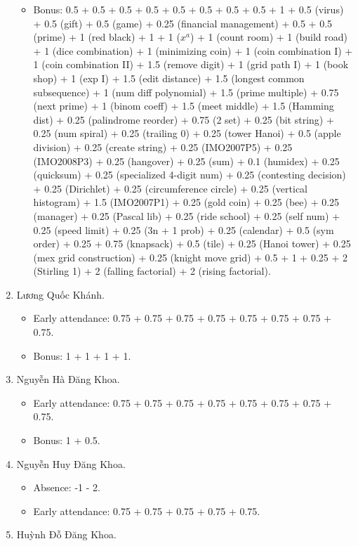 \documentclass{article}
\begin{document}
\begin{enumerate}
\begin{itemize}
		\item Bonus: 0.5 + 0.5 + 0.5 + 0.5 + 0.5 + 0.5 + 0.5 + 0.5 + 1 + 0.5 (virus) + 0.5 (gift) + 0.5 (game) + 0.25 (financial management) + 0.5 + 0.5 (prime) + 1 (red black) + 1 + 1 ($x^a$) + 1 (count room) + 1 (build road) + 1 (dice combination) + 1 (minimizing coin) + 1 (coin combination I) + 1 (coin combination II) + 1.5 (remove digit) + 1 (grid path I) + 1 (book shop) + 1 (exp I) + 1.5 (edit distance) + 1.5 (longest common subsequence) + 1 (num diff polynomial) + 1.5 (prime multiple) + 0.75 (next prime) + 1 (binom coeff) + 1.5 (meet middle) + 1.5 (Hamming dist) + 0.25 (palindrome reorder) + 0.75 (2 set) + 0.25 (bit string) + 0.25 (num spiral) + 0.25 (trailing 0) + 0.25 (tower Hanoi) + 0.5 (apple division) + 0.25 (create string) + 0.25 (IMO2007P5) + 0.25 (IMO2008P3) + 0.25 (hangover) + 0.25 (sum) + 0.1 (humidex) + 0.25 (quicksum) + 0.25 (specialized 4-digit num) + 0.25 (contesting decision) + 0.25 (Dirichlet) + 0.25 (circumference circle) + 0.25 (vertical histogram) + 1.5 (IMO2007P1) + 0.25 (gold coin) + 0.25 (bee) + 0.25 (manager) + 0.25 (Pascal lib) + 0.25 (ride school) + 0.25 (self num) + 0.25 (speed limit) + 0.25 (3n + 1 prob) + 0.25 (calendar) + 0.5 (sym order) + 0.25 + 0.75 (knapsack) + 0.5 (tile) + 0.25 (Hanoi tower) + 0.25 (mex grid construction) + 0.25 (knight move grid) + 0.5 + 1 + 0.25 + 2 (Stirling 1) + 2 (falling factorial) + 2 (rising factorial).
	\end{itemize}
	\item {\sc Lương Quốc Khánh.}
	\begin{itemize}
		\item Early attendance: 0.75 + 0.75 + 0.75 + 0.75 + 0.75 + 0.75 + 0.75 + 0.75.
		\item Bonus: 1 + 1 + 1 + 1.
	\end{itemize}
	\item {\sc Nguyễn Hà Đăng Khoa}.
	\begin{itemize}
		\item Early attendance: 0.75 + 0.75 + 0.75 + 0.75 + 0.75 + 0.75 + 0.75 + 0.75.
		\item Bonus: 1 + 0.5.
	\end{itemize}
	\item {\sc Nguyễn Huy Đăng Khoa.}
	\begin{itemize}
		\item Absence: -1 - 2.
		\item Early attendance: 0.75 + 0.75 + 0.75 + 0.75 + 0.75.
	\end{itemize}
	\item {\sc Huỳnh Đỗ Đăng Khoa.}

\end{enumerate}
\end{document}
